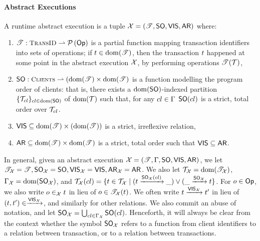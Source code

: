 \paragraph{Abstract Executions}

\begin{definition}
A runtime abstract execution is a tuple $\mathcal{X} = (\mathscr{T}, {\sf{SO}}, {\mathsf{VIS}}, {\sf{AR}})$ where: 
\begin{enumerate}
\item $\TtoOp{T} : \TransID \rightharpoonup \powerset{\Op}$ is a partial function mapping transaction 
identifiers into sets of operations; if $t \in \operatorname{dom}(\mathscr{T})$, then the transaction $t$ happened 
at some point in the abstract execution ${\mathcal{X}}$, by performing operations $\mathscr{T}(\mathcal{T})$, 
\item $\PO: \tidset \rightharpoonup (\dom(\TtoOp{T}) \times \dom(\TtoOp{T})$ is a function modelling the 
program order of clients: that is, there exists a $\operatorname{dom}({\sf{SO}})$-indexed partition $\{\mathcal{T}_{cl}\}_{cl \in \operatorname{dom}({\sf{SO}})}$ of 
$\operatorname{dom}(\mathscr{\mathcal{T}})$ such that, for any $cl \in \Gamma$ ${\sf{SO}}(cl)$ is a strict, total order over $\mathcal{T}_{cl}$.
\item ${\mathsf{VIS}} \subseteq \operatorname{dom}(\mathscr{T}) \times (\operatorname{dom}(\mathscr{T}))$ is a strict, irreflexive relation, 
\item ${\sf{AR}} \subseteq \operatorname{dom}(\mathscr{T}) \times \operatorname{dom}(\mathscr{T})$ is a strict, total order such that ${\mathsf{VIS}} \subseteq {\sf{AR}}$.
\end{enumerate}
\end{definition}
In general, given an abstract execution ${\mathcal{X}} = (\mathscr{T}, \Gamma, {\sf{SO}}, {\mathsf{VIS}}, {\sf{AR}})$, we let ${\mathscr{T}}_{\mathcal{X}} = \mathscr{T}, 
 {\sf{SO}}_{\mathcal{X}} = {\sf{SO}}, {{\mathsf{VIS}}}_{\mathcal{X}} = {\mathsf{VIS}}, {\sf{AR}}_{\mathcal{X}} = {\sf{AR}}$. We also let $\mathcal{T}_{\mathcal{X}} = \operatorname{dom}(\mathscr{T}_{\mathcal{X}})$, 
 $\Gamma_{\mathcal{X}} = \operatorname{dom}({\sf{SO}}_{\mathcal{X}})$, and $\mathcal{T}_{\mathcal{X}}(cl) = \{t \in \mathcal{T}_{\mathcal{X}} \mid (t \xrightarrow{{\sf{SO}}_{\mathcal{X}}(cl)} \_) 
 \vee (\_ \xrightarrow{{\sf{SO}}_{\mathcal{X}}} t \}$. For $o \in \mathsf{Op}$, we also write $o \in_{{\mathcal{X}}} t$ in lieu of $o \in \mathscr{T}_{\mathcal{X}}(t)$.
We often write $t \xrightarrow{{\mathsf{VIS}}_{{\mathcal{X}}}} t'$ in lieu of $(t, t') \in \xrightarrow{{\mathsf{VIS}}_{{\mathcal{X}}}}$, 
and similarly for other relations. We also commit an abuse of notation, and let ${\sf{SO}}_{{\mathcal{X}}} = 
\bigcup_{cl \in \Gamma_{\mathcal{X}}} {\sf{SO}}(cl)$. Henceforth, it will always be clear from the context 
whether the symbol ${\sf{SO}}_{\mathcal{X}}$ refers to a function from client identifiers to a relation between transaction, or to a relation
between transactions.

